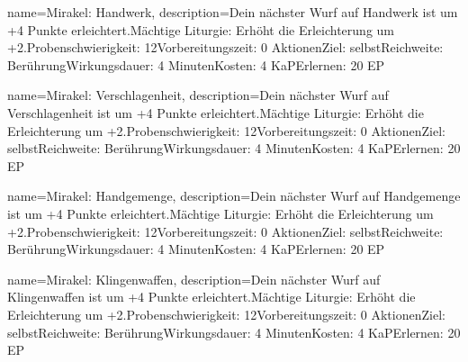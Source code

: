 {
    name={Mirakel: Handwerk},
    description={Dein nächster Wurf auf Handwerk ist um +4 Punkte erleichtert.\newline Mächtige Liturgie: Erhöht die Erleichterung um +2.\newline Probenschwierigkeit: 12\newline Vorbereitungszeit: 0 Aktionen\newline Ziel: selbst\newline Reichweite: Berührung\newline Wirkungsdauer: 4 Minuten\newline Kosten: 4 KaP\newline Erlernen: 20 EP}
}


{
    name={Mirakel: Verschlagenheit},
    description={Dein nächster Wurf auf Verschlagenheit ist um +4 Punkte erleichtert.\newline Mächtige Liturgie: Erhöht die Erleichterung um +2.\newline Probenschwierigkeit: 12\newline Vorbereitungszeit: 0 Aktionen\newline Ziel: selbst\newline Reichweite: Berührung\newline Wirkungsdauer: 4 Minuten\newline Kosten: 4 KaP\newline Erlernen: 20 EP}
}


{
    name={Mirakel: Handgemenge},
    description={Dein nächster Wurf auf Handgemenge ist um +4 Punkte erleichtert.\newline Mächtige Liturgie: Erhöht die Erleichterung um +2.\newline Probenschwierigkeit: 12\newline Vorbereitungszeit: 0 Aktionen\newline Ziel: selbst\newline Reichweite: Berührung\newline Wirkungsdauer: 4 Minuten\newline Kosten: 4 KaP\newline Erlernen: 20 EP}
}


{
    name={Mirakel: Klingenwaffen},
    description={Dein nächster Wurf auf Klingenwaffen ist um +4 Punkte erleichtert.\newline Mächtige Liturgie: Erhöht die Erleichterung um +2.\newline Probenschwierigkeit: 12\newline Vorbereitungszeit: 0 Aktionen\newline Ziel: selbst\newline Reichweite: Berührung\newline Wirkungsdauer: 4 Minuten\newline Kosten: 4 KaP\newline Erlernen: 20 EP}
}


